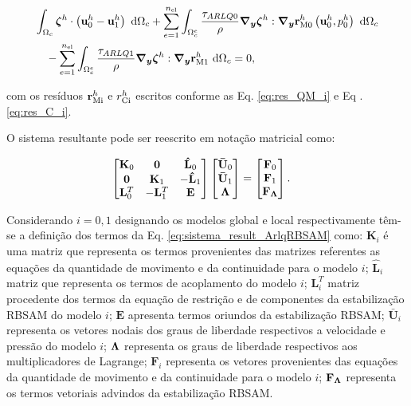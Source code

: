 \documentclass[tese_patricia]{subfiles}
\begin{document}
\begin{align}
	\begin{split}
	&\int_{\Omega_c}  \boldsymbol{\zeta}^h  \cdot \left(\mathbf{u}_0^h - \mathbf{u}_1^h \right) \ \mathrm{d} \Omega_c + \sum_{e=1}^{n_{\mathrm{el}}} \int_{\Omega^e_{c}} \frac{\tau_{ARLQ0}}{\rho} \boldsymbol{\nabla_y} \boldsymbol{\zeta}^h : \boldsymbol{\nabla_y} \mathbf{r}_{\mathrm{M0}}^{h}\left(\mathbf{u}_0^h,p_0^h\right) \ \mathrm{d} \Omega_c  \\
	&\quad-\sum_{e=1}^{n_{\mathrm{el}}} \int_{\Omega^e_{c}} \frac{\tau_{ARLQ1}}{\rho} \boldsymbol{\nabla_y} \boldsymbol{\zeta}^h : \boldsymbol{\nabla_y} \mathbf{r}_{\mathrm{M1}}^{h} \ \mathrm{d} \Omega_c = 0,
	\label{eq:lag_acopl_tARLQ}
\end{split}
\end{align}

\noindent com os resíduos $\mathbf{r}_{\mathrm{Mi}}^{h}$ e $r_{\mathrm{Ci}}^{h}$ escritos conforme as Eq. \ref{eq:res_QM_i} e Eq .\ref{eq:res_C_i}.

O sistema resultante pode ser reescrito em notação matricial como:

\begin{align}
	\begin{bmatrix}
		\mathbf{K}_{0} & \mathbf{0} & \mathbf{\hat{L}}_{0} \\
		\mathbf{0} & \mathbf{K}_{1} & - \mathbf{\hat{L}}_{1} \\
		\mathbf{L}_{0}^{T} & -\mathbf{L}_{1}^{T} & \mathbf{E}
	\end{bmatrix}
	\begin{bmatrix}
		\mathbf{\bar{U}}_{0} \\
		\mathbf{\bar{U}}_{1} \\
		\boldsymbol{\Lambda}
	\end{bmatrix}
	&=
	\begin{bmatrix}
		\mathbf{F}_0 \\
		\mathbf{F}_1 \\
		\mathbf{F}_{\boldsymbol{\Lambda}}
	\end{bmatrix}.
	\label{eq:sistema_result_ArlqRBSAM}
\end{align}	

Considerando $i=0,1$ designando os modelos global e local respectivamente têm-se a definição dos termos da Eq. \ref{eq:sistema_result_ArlqRBSAM} como: $\mathbf{K}_{i}$ é uma matriz que representa os termos provenientes das matrizes referentes as equações da quantidade de movimento e da continuidade para o modelo $i$; $\mathbf{\hat{L}}_{i}$ matriz que representa os termos de acoplamento do modelo $i$; $\mathbf{L}_{i}^{T}$ matriz procedente dos termos da equação de restrição e de componentes da estabilização RBSAM do modelo $i$; $\mathbf{E}$ apresenta termos oriundos da estabilização RBSAM; $\mathbf{\bar{U}}_{i}$ representa os vetores nodais dos graus de liberdade respectivos a velocidade e pressão do modelo $i$; $\boldsymbol{\Lambda}$ representa os graus de liberdade respectivos aos multiplicadores de Lagrange; $\mathbf{F}_i$ representa os vetores provenientes das equações da quantidade de movimento e da continuidade para o modelo $i$; $\mathbf{F}_{\boldsymbol{\Lambda}}$ representa os termos vetoriais advindos da estabilização RBSAM. 
\end{document}
